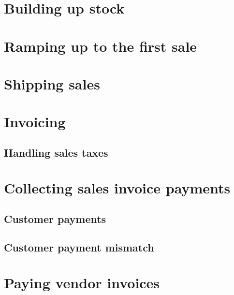 \chapter{Building up stock}
\label{cha:building-up-stock}

\chapter{Ramping up to the first sale}
\label{cha:ramping-up-to-the-first-sale}


\chapter{Shipping sales}
\label{cha:shipping-sales}

\chapter{Invoicing}
\label{cha:invoicing}

\section{Handling sales taxes}



% 


\chapter{Collecting sales invoice payments}
\label{cha:customer-payments}

\section{Customer payments}

\section{Customer payment mismatch}





\chapter{Paying vendor invoices}
\label{cha:vendor-payments}

